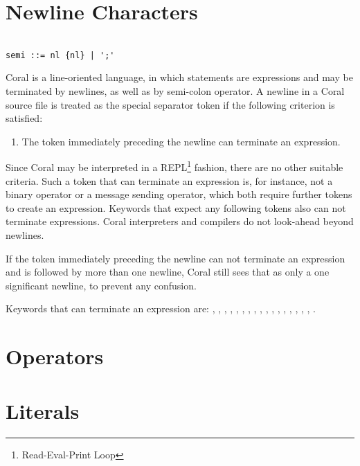 \section{Newline Characters}\label{sec:newlinecharacters}

\syntax\begin{lstlisting}

semi ::= nl {nl} | ';'

\end{lstlisting}

Coral is a line-oriented language, in which statements are expressions and may be terminated by newlines, as well as by semi-colon operator. A newline in a Coral source file is treated as the special separator token \lstinline@nl@ if the following criterion is satisfied:

\begin{enumerate}
\item The token immediately preceding the newline can terminate an expression.
\end{enumerate}

Since Coral may be interpreted in a REPL\footnote{Read-Eval-Print Loop} fashion, there are no other suitable criteria. Such a token that can terminate an expression is, for instance, not a binary operator or a message sending operator, which both require further tokens to create an expression. Keywords that expect any following tokens also can not terminate expressions. Coral interpreters and compilers do not look-ahead beyond newlines.

If the token immediately preceding the newline can not terminate an expression and is followed by more than one newline, Coral still sees that as only a one significant newline, to prevent any confusion.

Keywords that can terminate an expression are: \lstinline@break@, \lstinline@end@, \lstinline@opaque@, \lstinline@native@, \lstinline@next@, \lstinline@nil@, \lstinline@no@, \lstinline@redo@, \lstinline@retry@, \lstinline@return@, \lstinline@self@, \lstinline@skip@, \lstinline@super@, \lstinline@this@, \lstinline@transparent@, \lstinline@void@, \lstinline@yes@, \lstinline@yield@.

\section{Operators}\label{sec:operators}

\section{Literals}\label{sec:literals}

